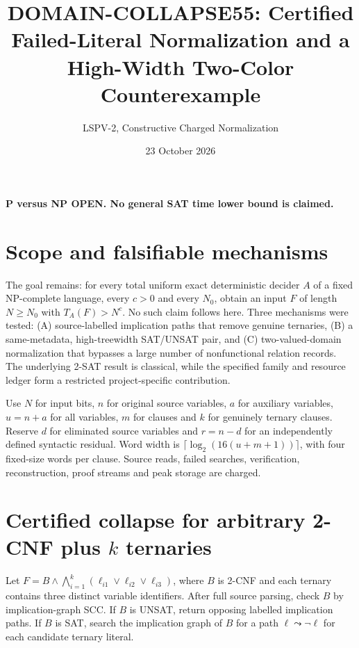 \documentclass[11pt]{article}
\title{DOMAIN-COLLAPSE55: Certified Failed-Literal Normalization and a High-Width Two-Color Counterexample}
\author{LSPV-2, Constructive Charged Normalization}
\date{23 October 2026}
\begin{document}
\maketitle
\begin{center}\textbf{P versus NP OPEN. No general SAT time lower bound is claimed.}\end{center}

\section{Scope and falsifiable mechanisms}
The goal remains: for every total uniform exact deterministic decider $A$ of a fixed NP-complete language, every $c>0$ and every $N_0$, obtain an input $F$ of length $N\ge N_0$ with $T_A(F)>N^c$. No such claim follows here. Three mechanisms were tested: (A) source-labelled implication paths that remove genuine ternaries, (B) a same-metadata, high-treewidth SAT/UNSAT pair, and (C) two-valued-domain normalization that bypasses a large number of nonfunctional relation records. The underlying 2-SAT result is classical, while the specified family and resource ledger form a restricted project-specific contribution.

Use $N$ for input bits, $n$ for original source variables, $a$ for auxiliary variables, $u=n+a$ for all variables, $m$ for clauses and $k$ for genuinely ternary clauses. Reserve $d$ for eliminated source variables and $r=n-d$ for an independently defined syntactic residual. Word width is $\lceil\log_2(16(u+m+1))\rceil$, with four fixed-size words per clause. Source reads, failed searches, verification, reconstruction, proof streams and peak storage are charged.

\section{Certified collapse for arbitrary 2-CNF plus $k$ ternaries}
Let $F=B\wedge\bigwedge_{i=1}^k(\ell_{i1}\vee\ell_{i2}\vee\ell_{i3})$, where $B$ is 2-CNF and each ternary contains three distinct variable identifiers. After full source parsing, check $B$ by implication-graph SCC. If $B$ is UNSAT, return opposing labelled implication paths. If $B$ is SAT, search the implication graph of $B$ for a path $\ell\leadsto\neg\ell$ for each candidate ternary literal.
\end{document}
